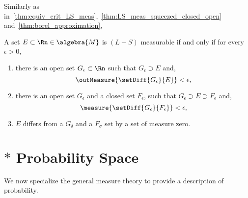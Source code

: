 Similarly as in~\ref{thm:equiv_crit_LS_meas},~\ref{thm:LS_meas_squeezed_closed_open}
and~\ref{thm:borel_approximation},
\begin{Theorem}[name=$(L-S)$ Measurability in $\Rn$]\label{thm:equiv_Lebesgue_meas_rn}
A set $E \subset \Rn \in \algebra{M}$ is $(L-S)$ measurable if and only if for every 
$\epsilon > 0$,
    \begin{enumerate}
	\item
	    there is an open set $G_{\epsilon} \subset \Rn$ such that
	    $G_{\epsilon} \supset E$ and,
	    \[\outMeasure{\setDiff{G_{\epsilon}}{E}} < \epsilon,\]
	\item
	    there is an open set $G_{\epsilon}$ and a closed set $F_{\epsilon}$, such that
	    $G_{\epsilon}\supset E \supset F_{\epsilon}$ and,
	    \[\measure{\setDiff{G_{\epsilon}}{F_{\epsilon}}} < \epsilon,\]
	\item
	    $E$ differs from a $G_{\delta}$ and a $F_{\sigma}$ set by a set of measure zero.
    \end{enumerate}
\end{Theorem}
\section{{$\ast$} Probability Space}
We now specialize the general measure theory to provide a description of probability.

